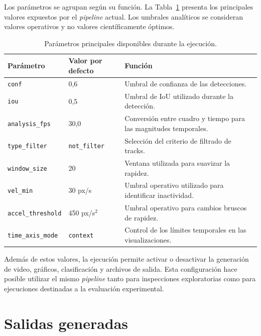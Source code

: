 Los parámetros se agrupan según su función. La Tabla~\ref{tab:parametros-sistema} presenta los principales valores expuestos por el \textit{pipeline} actual. Los umbrales analíticos se consideran valores operativos y no valores científicamente óptimos.

\begin{table}[H]
  \centering
  \footnotesize
  \setlength{\tabcolsep}{4pt}
  \renewcommand{\arraystretch}{1.10}
  \caption{Parámetros principales disponibles durante la ejecución.}
  \label{tab:parametros-sistema}
  \begin{tabularx}{0.96\textwidth}{@{}p{}p{}X@{}}
    \toprule
    \textbf{Parámetro} & \textbf{Valor por defecto} & \textbf{Función} \\
    \midrule
    \texttt{conf} & 0,6 & Umbral de confianza de las detecciones. \\
    \texttt{iou} & 0,5 & Umbral de IoU utilizado durante la detección. \\
    \texttt{analysis\_fps} & 30,0 & Conversión entre cuadro y tiempo para las magnitudes temporales. \\
    \texttt{type\_filter} & \texttt{not\_filter} & Selección del criterio de filtrado de tracks. \\
    \texttt{window\_size} & 20 & Ventana utilizada para suavizar la rapidez. \\
    \texttt{vel\_min} & 30 px/s & Umbral operativo utilizado para identificar inactividad. \\
    \texttt{accel\_threshold} & 450 px/s$^2$ & Umbral operativo para cambios bruscos de rapidez. \\
    \texttt{time\_axis\_mode} & \texttt{context} & Control de los límites temporales en las visualizaciones. \\
    \bottomrule
  \end{tabularx}
\end{table}

Además de estos valores, la ejecución permite activar o desactivar la generación de video, gráficos, clasificación y archivos de salida. Esta configuración hace posible utilizar el mismo \textit{pipeline} tanto para inspecciones exploratorias como para ejecuciones destinadas a la evaluación experimental.

\section{Salidas generadas}

